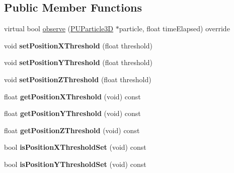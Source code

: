 \subsection*{Public Member Functions}
\begin{DoxyCompactItemize}
\item 
virtual bool \hyperlink{classPUOnPositionObserver_ab6d9011751d16face64818214a1acd21}{observe} (\hyperlink{structPUParticle3D}{P\+U\+Particle3D} $\ast$particle, float time\+Elapsed) override
\item 
\mbox{\label{classPUOnPositionObserver_a3d7b7abe52c6a99dc900bb6d2a3eccde}} 
void {\bfseries set\+Position\+X\+Threshold} (float threshold)
\item 
\mbox{\label{classPUOnPositionObserver_af5bb78d007e7c328158275ab72f46914}} 
void {\bfseries set\+Position\+Y\+Threshold} (float threshold)
\item 
\mbox{\label{classPUOnPositionObserver_a39970af06ca89eed8ef77951722444e9}} 
void {\bfseries set\+Position\+Z\+Threshold} (float threshold)
\item 
\mbox{\label{classPUOnPositionObserver_ae949a2e18d7f37632c1a936a0f696ecd}} 
float {\bfseries get\+Position\+X\+Threshold} (void) const
\item 
\mbox{\label{classPUOnPositionObserver_a57a83e01d729f0dcfd06d675890e6e1c}} 
float {\bfseries get\+Position\+Y\+Threshold} (void) const
\item 
\mbox{\label{classPUOnPositionObserver_a025bb94eb83e297758f1770de8d505d6}} 
float {\bfseries get\+Position\+Z\+Threshold} (void) const
\item 
\mbox{\label{classPUOnPositionObserver_aec6fee9ab70e5ef445a42f7ceff0d99a}} 
bool {\bfseries is\+Position\+X\+Threshold\+Set} (void) const
\item 
\mbox{\label{classPUOnPositionObserver_a70f6848653b8c31af01325f125159970}} 
bool {\bfseries is\+Position\+Y\+Threshold\+Set} (void) const
\item 

\end{DoxyCompactItemize}
